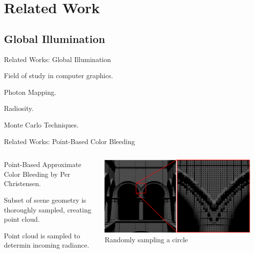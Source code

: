 \documentclass[10pt,handout,compress,professionalfont]{beamer}
\begin{document}
\section{Related Work}
\subsection{Global Illumination}
\begin{frame}{Related Works: Global Illumination}

    Field of study in computer graphics.

    Photon Mapping.

    Radiosity.

    Monte Carlo Techniques.

\end{frame}




\begin{frame}{Related Works: Point-Based Color Bleeding}



    \begin{columns}
        \begin{column}{0.6\textwidth}

    \vspace{-10mm}
    Point-Based Approximate Color Bleeding by Per Christensen.\\
    \vspace{8mm}

    Subset of scene geometry is thoroughly sampled, creating point cloud.\\
    \vspace{8mm}

    Point cloud is sampled to determin incoming radiance.

        \end{column}
        \begin{column}{0.4\textwidth}
            \vspace{-4mm}
            \includegraphics[width=\textwidth]{../img/pcloud}\\
            {\centering\scriptsize Randomly sampling a circle\\}
        \end{column}
    \end{columns}

\end{frame}
\end{document}
